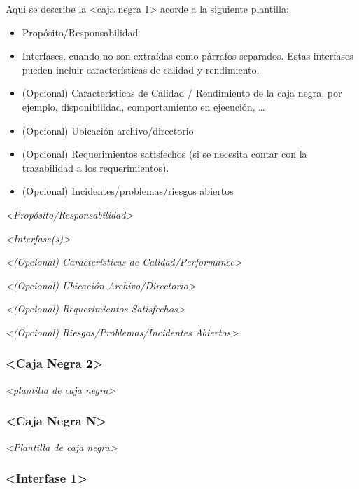 \documentclass[]{article}
\begin{document}
Aqui se describe la \textless{}caja negra 1\textgreater{} acorde a la
siguiente plantilla:

\begin{itemize}
\item
  Propósito/Responsabilidad
\item
  Interfases, cuando no son extraídas como párrafos separados. Estas
  interfases pueden incluir características de calidad y rendimiento.
\item
  (Opcional) Características de Calidad / Rendimiento de la caja negra,
  por ejemplo, disponibilidad, comportamiento en ejecución, \ldots{}
\item
  (Opcional) Ubicación archivo/directorio
\item
  (Opcional) Requerimientos satisfechos (si se necesita contar con la
  trazabilidad a los requerimientos).
\item
  (Opcional) Incidentes/problemas/riesgos abiertos
\end{itemize}

\emph{\textless{}Propósito/Responsabilidad\textgreater{}}

\emph{\textless{}Interfase(s)\textgreater{}}

\emph{\textless{}(Opcional) Características de
Calidad/Performance\textgreater{}}

\emph{\textless{}(Opcional) Ubicación Archivo/Directorio\textgreater{}}

\emph{\textless{}(Opcional) Requerimientos Satisfechos\textgreater{}}

\emph{\textless{}(Opcional) Riesgos/Problemas/Incidentes
Abiertos\textgreater{}}

\hypertarget{__caja_negra_2}{%
\subsubsection{\textless{}Caja Negra
2\textgreater{}}\label{__caja_negra_2}}

\emph{\textless{}plantilla de caja negra\textgreater{}}

\hypertarget{__caja_negra_n}{%
\subsubsection{\textless{}Caja Negra
N\textgreater{}}\label{__caja_negra_n}}

\emph{\textless{}Plantilla de caja negra\textgreater{}}

\hypertarget{__interfase_1}{%
\subsubsection{\textless{}Interfase
1\textgreater{}}\label{__interfase_1}}
\end{document}
